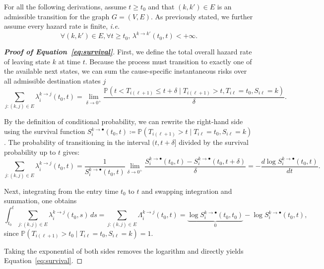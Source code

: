 \documentclass{sn-jnl}
\begin{document}
For all the following derivations, assume $t \geq t_0$ and that $(k, k') \in E$ is an admissible transition for the graph $G = (V, E)$. As previously stated, we further assume every hazard rate is finite, \textit{i.e.}
\[
\forall (k, k') \in E, \forall t \geq t_0, \, \lambda^{k \to k'}(t_0, t) < +\infty.
\]

\bigbreak

\begin{proof}[\textbf{Proof of Equation~\ref{eq:survival}}]
First, we define the total overall hazard rate of leaving state $k$ at time $t$. Because the process must transition to exactly one of the available next states, we can sum the cause-specific instantaneous risks over all admissible destination states $j$
\[
\sum_{j : (k, j) \in E} \lambda_i^{k \to j}(t_0, t) = \lim_{\delta \to 0^+} \frac{\mathbb{P}(t < T_{i(\ell+1)} \leq t + \delta \mid T_{i(\ell+1)} > t, T_{i\ell}=t_0, S_{i\ell}=k)}{\delta}.
\]

\bigbreak

By the definition of conditional probability, we can rewrite the right-hand side using the survival function $S_i^{k \to \bullet}(t_0, t) \coloneqq \mathbb{P}(T_{i(\ell+1)} > t \mid T_{i\ell}=t_0, S_{i\ell}=k)$. The probability of transitioning in the interval $(t, t+\delta]$ divided by the survival probability up to $t$ gives:
\[
\sum_{j : (k, j) \in E} \lambda_i^{k \to j}(t_0, t) = \frac{1}{S_i^{k \to \bullet}(t_0, t)} \lim_{\delta \to 0^+} \frac{S_i^{k \to \bullet}(t_0, t) - S_i^{k \to \bullet}(t_0, t + \delta)}{\delta} = -\frac{d\log S_i^{k \to \bullet}(t_0, t)}{dt}. 
\]

Next, integrating from the entry time $t_0$ to $t$ and swapping integration and summation, one obtains
\[
\int_{t_0}^t \sum_{j : (k, j) \in E} \lambda_i^{k \to j}(t_0, s) \, ds = \sum_{j : (k, j) \in E} \Lambda_i^{k \to j}(t_0, t) = \underbrace{\log S_i^{k \to \bullet}(t_0, t_0)}_0 - \log S_i^{k \to \bullet}(t_0, t),
\]
since $\mathbb{P}(T_{i(\ell+1)} > t_0 \mid T_{i\ell} = t_0, S_{i\ell} = k) = 1$.

\bigbreak

Taking the exponential of both sides removes the logarithm and directly yields Equation~\ref{eq:survival}.
\end{proof}

\bigbreak
\end{document}
